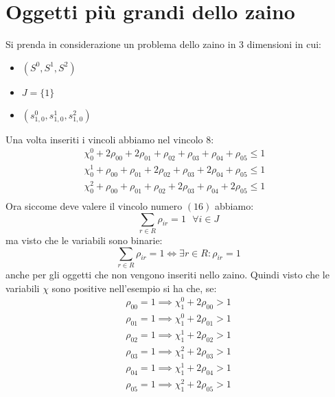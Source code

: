 \documentclass{scrartcl}
\begin{document}
\section{Oggetti più grandi dello zaino}
Si prenda in considerazione un problema dello zaino in 3 dimensioni in cui:
\begin{itemize}
	\item $(S^0,S^1,S^2)$
	\item $J = \{1\}$
	\item $(s_{1, 0}^0,s_{1,0}^1, s_{1,0}^2)$
\end{itemize}
Una volta inseriti i vincoli abbiamo nel vincolo 8:
$$
\begin{array}{ll}
\chi_0^0 + 2 \rho_{00} + 2 \rho_{01} + \rho_{02} + \rho_{03} + \rho_{04} + \rho_{05} \leq 1 & \\
\chi_0^1 +  \rho_{00} +  \rho_{01} + 2 \rho_{02} + \rho_{03} + 2 \rho_{04} + \rho_{05} \leq 1 & \\
\chi_0^2 +  \rho_{00} +  \rho_{01} + \rho_{02} + 2 \rho_{03} + \rho_{04} + 2 \rho_{05} \leq 1 & \\
\end{array}
$$
Ora siccome deve valere il vincolo numero $(16)$ abbiamo:
$$
\sum_{r\in R} \rho_{ir} = 1 \ \ \ \forall i \in J
$$
ma visto che le variabili sono binarie:
$$
\sum_{r\in R} \rho_{ir} = 1 \iff \exists r \in R : \rho_{ir} = 1
$$
anche per gli oggetti che non vengono inseriti nello zaino.
Quindi visto che le variabili $\chi$ sono positive nell'esempio si ha che, se:
$$
\begin{array}{l}
\rho_{00} = 1 \implies \chi_1^0 + 2 \rho_{00} > 1 \\
\rho_{01} = 1 \implies \chi_1^0 + 2 \rho_{01} > 1 \\
\rho_{02} = 1 \implies \chi_1^1 + 2 \rho_{02} > 1 \\
\rho_{03} = 1 \implies \chi_1^2 + 2 \rho_{03} > 1 \\
\rho_{04} = 1 \implies \chi_1^1 + 2 \rho_{04} > 1 \\
\rho_{05} = 1 \implies \chi_1^2 + 2 \rho_{05} > 1 \\
\end{array}
$$


\end{document}
